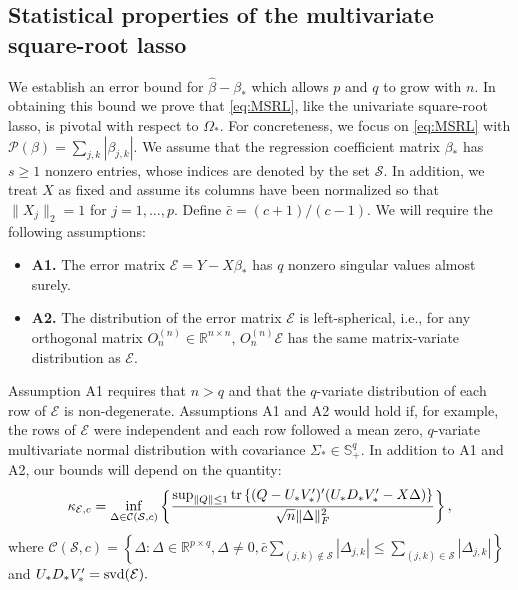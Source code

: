 \documentclass[12pt]{article}
\begin{document}
\subsection{Statistical properties of the multivariate square-root lasso}
We establish an error bound for $\hat{\beta} - \beta_*$ which allows $p$ and $q$ to grow with $n$. In obtaining this bound we prove that \eqref{eq:MSRL}, like the univariate square-root lasso, is pivotal with respect to $\Omega_*$. For concreteness, we focus on \eqref{eq:MSRL} with $\mathcal{P}(\beta) = \sum_{j,k}|\beta_{j,k}|$. We assume that the regression coefficient matrix $\beta_*$ has $s \geq 1$ nonzero entries, whose indices are denoted by the set $\mathcal{S}$. In addition, we treat $X$ as fixed and assume its columns have been normalized so that $\|X_j\|_2 = 1$ for $j = 1, \dots, p$. Define $\bar{c} = (c+1)/(c-1)$. We will require the following assumptions: 
\begin{itemize}
 \item[] \textbf{A1.} The error matrix $\mathcal{E} = Y - X\beta_*$ has $q$ nonzero singular values almost surely. 
 \item[]\textbf{A2.} The distribution of the error matrix $\mathcal{E}$ is left-spherical, i.e., for any orthogonal matrix $O_n^{(n)} \in \mathbb{R}^{n \times n}$, 
$O_n^{(n)} \mathcal{E}$ has the same matrix-variate distribution as $\mathcal{E}$. 
\end{itemize}
Assumption A1 requires that $n > q$ and that the $q$-variate distribution of each row of $\mathcal{E}$ is non-degenerate. Assumptions A1 and A2 would hold if, for example, the rows of $\mathcal{E}$ were independent and each row followed a mean zero, $q$-variate multivariate normal distribution with covariance $\Sigma_* \in \mathbb{S}^q_+.$ In addition to A1 and A2, our bounds will depend on the quantity:
$$\kappa_{\mathcal{E},c} = \inf_{\Delta \in \mathcal{C}(\mathcal{S}, c)} \left\{ \frac{\sup_{\|Q\| \leq 1} {\rm tr}\left\{ (Q - U_*V_*')'(U_*D_*V_*' - X \Delta) \right\} }{ \sqrt{n}\|\Delta\|_F^2}\right\},$$
where $\mathcal{C}(\mathcal{S}, c) = \left\{ \Delta: \Delta \in \mathbb{R}^{p \times q}, \Delta  \neq 0, \bar{c} \sum_{(j,k) \notin \mathcal{S}}|\Delta_{j,k}| \leq \sum_{(j,k) \in \mathcal{S}}|\Delta_{j,k}| \right\}$ and $U_*D_*V_*' = {\rm svd}(\mathcal{E}).$
\end{document}
